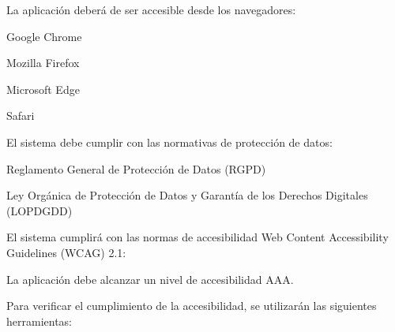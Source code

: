 
\begin{RNF}
	\item La aplicación deberá de ser accesible desde los navegadores:
	\begin{RNF}
		\item Google Chrome
		\item Mozilla Firefox
		\item Microsoft Edge
		\item Safari
	\end{RNF}

	\item El sistema debe cumplir con las normativas de protección de datos:
	\begin{RNF}
		\item Reglamento General de Protección de Datos (RGPD)
		\item Ley Orgánica de Protección de Datos y Garantía de los Derechos Digitales (LOPDGDD)
	\end{RNF}
	\item El sistema cumplirá con las normas de accesibilidad Web Content Accessibility Guidelines (WCAG) 2.1:
	\begin{RNF}
		\item La aplicación debe alcanzar un nivel de accesibilidad AAA.
		\begin{RNF}
			\item Para verificar el cumplimiento de la accesibilidad, se utilizarán las siguientes herramientas:
			\begin{RNF}
				\item {}
				\item {}
			\end{RNF}
		\end{RNF}
	\end{RNF}



\end{RNF}
